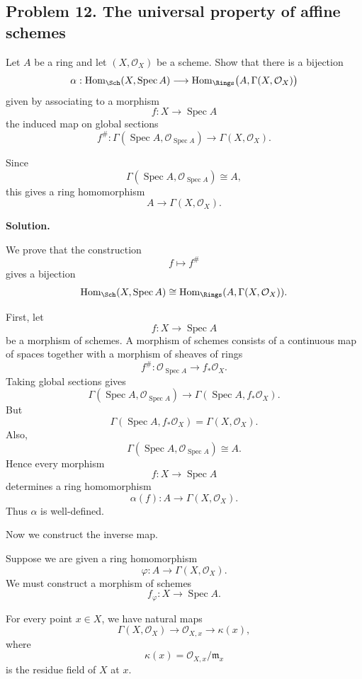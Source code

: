 
\subsection*{Problem 12. The universal property of affine schemes}

Let \(A\) be a ring and let \((X,\mathcal O_X)\) be a scheme. Show that there is a bijection
\[
\alpha:
\operatorname{Hom}_{\Sch}(X,\operatorname{Spec} A)
\longrightarrow
\operatorname{Hom}_{\Rings}\bigl(A,\Gamma(X,\mathcal O_X)\bigr)
\]
given by associating to a morphism
\[
f:X\to \operatorname{Spec} A
\]
the induced map on global sections
\[
f^\#:
\Gamma(\operatorname{Spec} A,\mathcal O_{\operatorname{Spec} A})
\longrightarrow
\Gamma(X,\mathcal O_X).
\]

Since
\[
\Gamma(\operatorname{Spec} A,\mathcal O_{\operatorname{Spec} A})\cong A,
\]
this gives a ring homomorphism
\[
A\to \Gamma(X,\mathcal O_X).
\]

\textbf{Solution.}

We prove that the construction
\[
f\longmapsto f^\#
\]
gives a bijection
\[
\operatorname{Hom}_{\Sch}(X,\operatorname{Spec} A)
\cong
\operatorname{Hom}_{\Rings}(A,\Gamma(X,\mathcal O_X)).
\]

First, let
\[
f:X\to \operatorname{Spec} A
\]
be a morphism of schemes. A morphism of schemes consists of a continuous map of spaces together with a morphism of sheaves of rings
\[
f^\#:\mathcal O_{\operatorname{Spec} A}\to f_*\mathcal O_X.
\]
Taking global sections gives
\[
\Gamma(\operatorname{Spec} A,\mathcal O_{\operatorname{Spec} A})
\longrightarrow
\Gamma(\operatorname{Spec} A,f_*\mathcal O_X).
\]
But
\[
\Gamma(\operatorname{Spec} A,f_*\mathcal O_X)
=
\Gamma(X,\mathcal O_X).
\]
Also,
\[
\Gamma(\operatorname{Spec} A,\mathcal O_{\operatorname{Spec} A})\cong A.
\]
Hence every morphism
\[
f:X\to \operatorname{Spec} A
\]
determines a ring homomorphism
\[
\alpha(f):A\to \Gamma(X,\mathcal O_X).
\]
Thus \(\alpha\) is well-defined.

Now we construct the inverse map.

Suppose we are given a ring homomorphism
\[
\varphi:A\to \Gamma(X,\mathcal O_X).
\]
We must construct a morphism of schemes
\[
f_\varphi:X\to \operatorname{Spec} A.
\]

For every point \(x\in X\), we have natural maps
\[
\Gamma(X,\mathcal O_X)
\longrightarrow
\mathcal O_{X,x}
\longrightarrow
\kappa(x),
\]
where
\[
\kappa(x)=\mathcal O_{X,x}/\mathfrak m_x
\]
is the residue field of \(X\) at \(x\).


